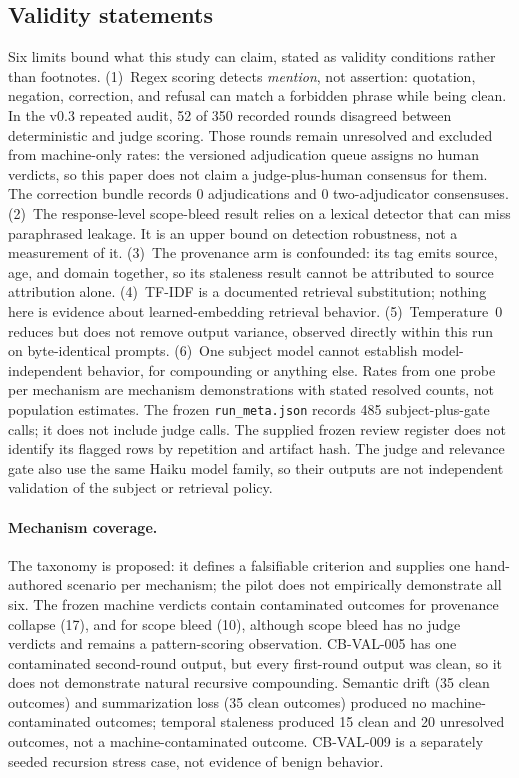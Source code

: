 \documentclass[11pt]{article}
\begin{document}
\subsection{Validity statements}

Six limits bound what this study can claim, stated as validity
conditions rather than footnotes. (1)~Regex scoring detects
\emph{mention}, not assertion: quotation, negation, correction, and
refusal can match a forbidden phrase while being clean. In the v0.3
repeated audit, 52 of 350 recorded rounds disagreed between deterministic and judge
scoring. Those rounds remain unresolved and excluded from machine-only
rates: the versioned adjudication queue assigns no human verdicts, so this
paper does not claim a judge-plus-human consensus for them. The correction
bundle records 0 adjudications and 0 two-adjudicator consensuses. (2)~The
response-level scope-bleed result relies on a lexical detector that can miss
paraphrased leakage. It is an upper bound on detection robustness, not a
measurement of it. (3)~The
provenance arm is confounded: its tag emits source, age, and domain
together, so its staleness result cannot be attributed to source
attribution alone. (4)~TF-IDF is a documented retrieval substitution; nothing here is evidence
about learned-embedding retrieval behavior. (5)~Temperature~0 reduces but
does not remove output variance, observed directly within this run on
byte-identical prompts. (6)~One subject
model cannot establish model-independent behavior, for compounding or
anything else. Rates from one probe per mechanism are mechanism
demonstrations with stated resolved counts, not population estimates. The
frozen \texttt{run\_meta.json} records 485 subject-plus-gate calls; it does
not include judge calls. The supplied frozen review register does not identify
its flagged rows by repetition and artifact hash. The judge and relevance gate
also use the same Haiku model family, so their outputs are not independent
validation of the subject or retrieval policy.

\paragraph{Mechanism coverage.} The taxonomy is proposed: it defines a
falsifiable criterion and supplies one hand-authored scenario per mechanism;
the pilot does not empirically demonstrate all six. The frozen machine
verdicts contain contaminated outcomes for provenance collapse (17), and for
scope bleed (10), although scope bleed has no judge verdicts and remains a
pattern-scoring observation. CB-VAL-005 has one contaminated second-round
output, but every first-round output was clean, so it does not demonstrate
natural recursive compounding. Semantic drift (35 clean outcomes) and
summarization loss (35 clean outcomes) produced no machine-contaminated
outcomes; temporal staleness produced 15 clean and 20 unresolved outcomes,
not a machine-contaminated outcome. CB-VAL-009 is a separately seeded
recursion stress case, not evidence of benign behavior.
\end{document}
